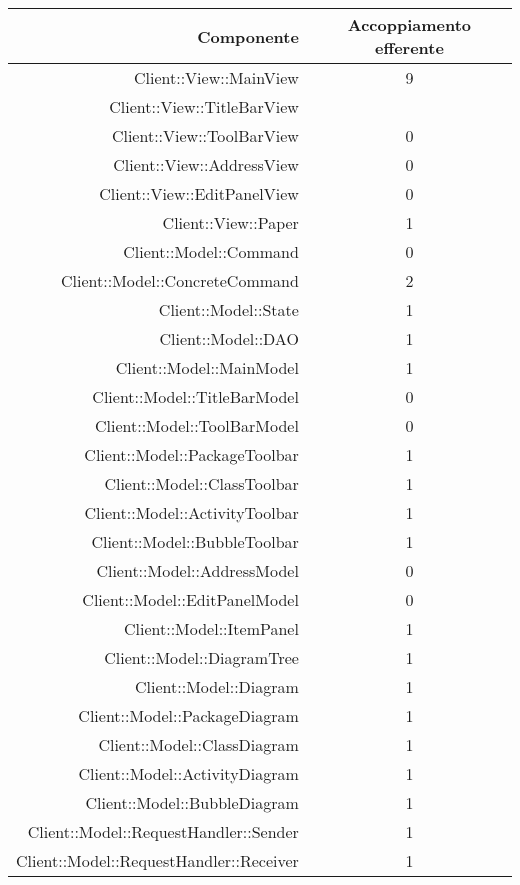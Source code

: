 \documentclass[../PianoDiQualifica.tex]{subfiles}
\begin{document}
					\begin{longtable}{|r|c|}
						\hline
						\rowcolor{blue!30}\textbf{Componente} & \textbf{Accoppiamento efferente} \\
						\hline
						\endhead
						Client::View::MainView & 9 \\ \hline
						Client::View::TitleBarView & \\ \hline
						Client::View::ToolBarView & 0 \\ \hline
						Client::View::AddressView & 0 \\ \hline
						Client::View::EditPanelView & 0 \\ \hline
						Client::View::Paper & 1 \\ \hline
						Client::Model::Command & 0\\ \hline
						Client::Model::ConcreteCommand & 2 \\ \hline
						Client::Model::State & 1 \\ \hline
						Client::Model::DAO & 1 \\ \hline
						Client::Model::MainModel & 1 \\ \hline
						Client::Model::TitleBarModel & 0 \\ \hline
						Client::Model::ToolBarModel & 0 \\ \hline
						Client::Model::PackageToolbar & 1 \\ \hline
						Client::Model::ClassToolbar & 1 \\ \hline
						Client::Model::ActivityToolbar & 1 \\ \hline
						Client::Model::BubbleToolbar & 1 \\ \hline
						Client::Model::AddressModel & 0 \\ \hline
						Client::Model::EditPanelModel & 0 \\ \hline
						Client::Model::ItemPanel & 1 \\ \hline
						Client::Model::DiagramTree & 1 \\ \hline
						Client::Model::Diagram & 1 \\ \hline
						Client::Model::PackageDiagram & 1 \\ \hline
						Client::Model::ClassDiagram & 1 \\ \hline
						Client::Model::ActivityDiagram & 1 \\ \hline
						Client::Model::BubbleDiagram & 1 \\ \hline
						Client::Model::RequestHandler::Sender & 1 \\ \hline
						Client::Model::RequestHandler::Receiver & 1 \\ \hline

\end{longtable}
\end{document}
